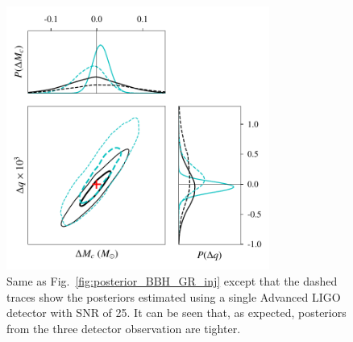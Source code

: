 \documentclass[prd,preprintnumbers,twocolumn,eqsecnum,floatfix,a4paper,nofootinbib,superscriptaddress]{revtex4}
\begin{document}
\begin{figure}[htb] \begin{center}
		\includegraphics[width=3.4in]{figs/hm_mcq_1det_3det_compare_GR.pdf}
		\caption{Same as Fig.~\ref{fig:posterior_BBH_GR_inj} except that the dashed traces show the posteriors estimated using a single Advanced LIGO detector with SNR of 25. It can be seen that, as expected, posteriors from the three detector observation are tighter.}
		\label{fig:hm_mcq_compare-1det_3det_GR_inj}
	\end{center} \end{figure}
\end{document}
